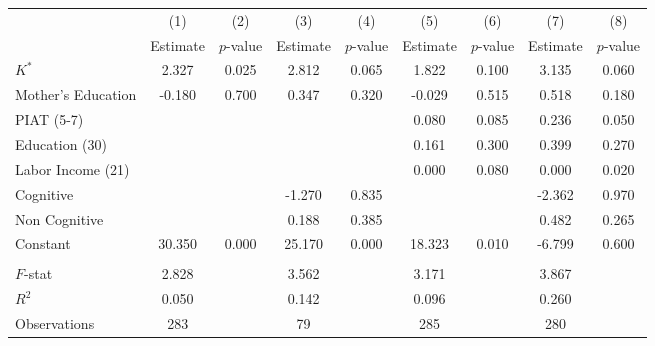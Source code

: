 \begin{tabular}{lcccccccc} \toprule
 & (1) & (2) & (3) & (4) & (5) & (6) & (7) & (8) \\
 & Estimate  & $p$-value  & Estimate  & $p$-value  & Estimate  & $p$-value  & Estimate  & $p$-value  \\  \midrule
$K^\ast$ &     2.327 &     0.025 &     2.812 &     0.065 &     1.822 &     0.100 &     3.135 &     0.060 \\
Mother's Education &    -0.180 &     0.700 &     0.347 &     0.320 &    -0.029 &     0.515 &     0.518 &     0.180 \\
PIAT (5-7) &         &         &         &         &     0.080 &     0.085 &     0.236 &     0.050 \\
Education (30) &         &         &         &         &     0.161 &     0.300 &     0.399 &     0.270 \\
Labor Income (21) &         &         &         &         &     0.000 &     0.080 &     0.000 &     0.020 \\
Cognitive &         &         &    -1.270 &     0.835 &         &         &    -2.362 &     0.970 \\
Non Cognitive &         &         &     0.188 &     0.385 &         &         &     0.482 &     0.265 \\
Constant &    30.350 &     0.000 &    25.170 &     0.000 &    18.323 &     0.010 &    -6.799 &     0.600 \\ \\ \midrule
$F$-stat &     2.828 &         &     3.562 &         &     3.171 &         &     3.867 &         \\
$R^2$ &     0.050 &         &     0.142 &         &     0.096 &         &     0.260 &         \\
Observations &   283 &         &    79 &         &   285 &         &   280 &         \\
\bottomrule \end{tabular} 